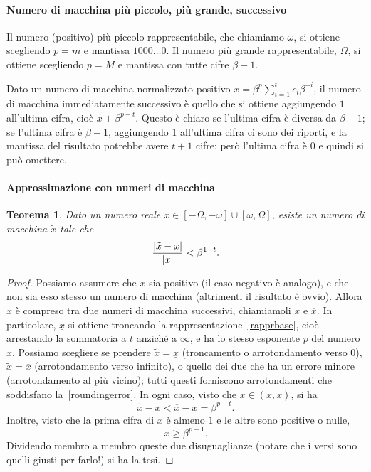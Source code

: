 \documentclass[a4paper]{report}
\DeclarePairedDelimiter{\abs}{\lvert}{\rvert}
\newtheorem{theorem}{Teorema}[chapter]
\theoremstyle{definiton}
\theoremstyle{remark}
\begin{document}
\paragraph{Numero di macchina più piccolo, più grande, successivo}  
Il numero (positivo) più piccolo rappresentabile, che chiamiamo $\omega$, si ottiene scegliendo $p=m$ e mantissa $1000\dots 0$. Il numero più grande rappresentabile, $\Omega$, si ottiene scegliendo $p=M$ e mantissa con tutte cifre $\beta-1$.

Dato un numero di macchina normalizzato positivo $x = \beta^p \sum_{i=1}^t c_i \beta^{-i}$, il numero di macchina immediatamente successivo è quello che si ottiene aggiungendo $1$ all'ultima cifra, cioè $x + \beta^{p-t}$. Questo è chiaro se l'ultima cifra è diversa da $\beta-1$; se l'ultima cifra è $\beta-1$, aggiungendo 1 all'ultima cifra ci sono dei riporti, e la mantissa del risultato potrebbe avere $t+1$ cifre; però l'ultima cifra è $0$ e quindi si può omettere.

\paragraph{Approssimazione con numeri di macchina}

\begin{theorem} \label{th:precmacchina} Dato un numero reale $x \in [-\Omega, -\omega] \cup [\omega, \Omega]$, esiste un numero di macchina $\tilde{x}$ tale che
\begin{equation} \label{roundingerror}
    \frac{\abs{\tilde{x}-x}}{\abs{x}} < \beta^{1-t}.    
\end{equation}
\end{theorem}
\begin{proof}
Possiamo assumere che $x$ sia positivo (il caso negativo è analogo), e che non sia esso stesso un numero di macchina (altrimenti il risultato è ovvio). Allora $x$ è compreso tra due numeri di macchina successivi, chiamiamoli $\underline{x}$ e $\overline{x}$. In particolare, $\underline{x}$ si ottiene troncando la rappresentazione~\eqref{rapprbase}, cioè arrestando la sommatoria a $t$ anziché a $\infty$, e ha lo stesso esponente $p$ del numero $x$. Possiamo scegliere se prendere $\tilde{x} = \underline{x}$ (troncamento o arrotondamento verso $0$), $\tilde{x} = \overline{x}$ (arrotondamento verso infinito), o quello dei due che ha un errore minore (arrotondamento al più vicino); tutti questi forniscono arrotondamenti che soddisfano la~\eqref{roundingerror}. In ogni caso, visto che $x \in (\underline{x}, \overline{x})$, si ha 
\begin{equation}
    \tilde{x}-x < \overline{x} - \underline{x} = \beta^{p-t}.
\end{equation}
Inoltre, visto che la prima cifra di $x$ è almeno $1$ e le altre sono positive o nulle,
\begin{equation}
    x \geq \beta^{p-1}.
\end{equation}
Dividendo membro a membro queste due disuguaglianze (notare che i versi sono quelli giusti per farlo!) si ha la tesi.
\end{proof}
\end{document}
